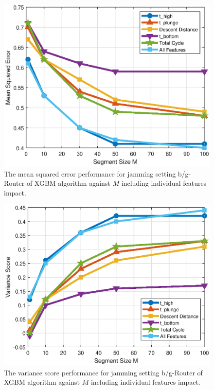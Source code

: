 	\begin{figure}[tbp]
	    \centering
		\includegraphics[width=0.9\columnwidth]{./chapter-ftml/plots/001_MSE_F_3.eps}
		\caption{The mean squared error performance for jamming setting b/g-Router of XGBM algorithm against $M$ including individual features impact.}
		\label{fig:001_MSE_F_3}      
	\end{figure}
	
		\begin{figure}[tbp]
	    \centering
		\includegraphics[width=0.9\columnwidth]{./chapter-ftml/plots/001_R2_F_3.eps}
		\caption{The variance score performance for jamming setting b/g-Router of XGBM algorithm against $M$ including individual features impact.}
		\label{fig:001_R2_F_3}      
	\end{figure}
	
